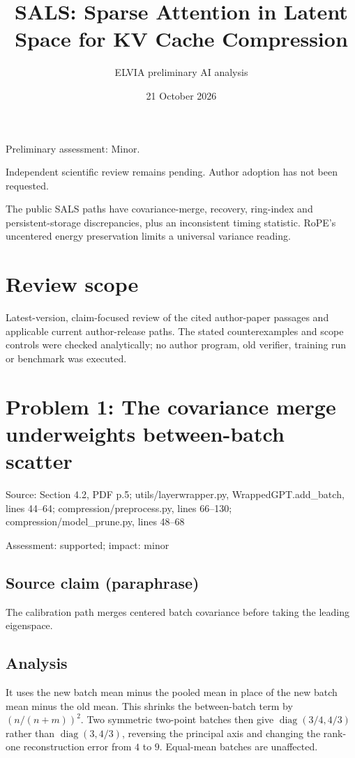 \documentclass[11pt]{article}
\begin{document}
\title{SALS: Sparse Attention in Latent Space for KV Cache Compression}

\author{ELVIA preliminary AI analysis}\date{21 October 2026}\maketitle

Preliminary assessment: Minor.\par

Independent scientific review remains pending. Author adoption has not been requested.

The public SALS paths have covariance-merge, recovery, ring-index and persistent-storage discrepancies, plus an inconsistent timing statistic. RoPE’s uncentered energy preservation limits a universal variance reading.

\section*{Review scope}

Latest-version, claim-focused review of the cited author-paper passages and applicable current author-release paths. The stated counterexamples and scope controls were checked analytically; no author program, old verifier, training run or benchmark was executed.

\section*{Problem 1: The covariance merge underweights between-batch scatter}

Source: Section 4.2, PDF p.5; utils/layerwrapper.py, WrappedGPT.add\_batch, lines 44–64; compression/preprocess.py, lines 66–130; compression/model\_prune.py, lines 48–68

Assessment: supported; impact: minor

\subsection*{Source claim (paraphrase)}

The calibration path merges centered batch covariance before taking the leading eigenspace.

\subsection*{Analysis}

It uses the new batch mean minus the pooled mean in place of the new batch mean minus the old mean. This shrinks the between-batch term by \((n/(n+m))^2\). Two symmetric two-point batches then give \(\operatorname{diag}(3/4,4/3)\) rather than \(\operatorname{diag}(3,4/3)\), reversing the principal axis and changing the rank-one reconstruction error from \(4\) to \(9\). Equal-mean batches are unaffected.
\end{document}
